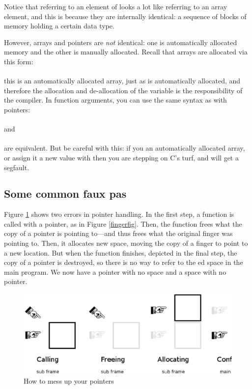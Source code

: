 \documentclass[12pt]{article}
\begin{document}
Notice that referring to an element of  looks a lot
like referring to an array element, and this is because they are
internally identical: a sequence of blocks of memory holding a certain
data type. 

However, arrays and pointers are {\em not} identical: one is
automatically allocated memory and the other is manually allocated.
Recall that arrays are allocated via this form:\\
\\
this is an automatically allocated array, just
as  is automatically allocated, and therefore
the allocation and de-allocation of the variable is the responsibility
of the compiler.  In function arguments, you can use the same
syntax as with pointers: 
\\ \\
and
\\ \\
are equivalent.
But be careful with this: if you  an automatically allocated
array, or assign it a new value with  then you are stepping
on C's turf, and will get a segfault.

\subsection{Some common faux pas} 
Figure \ref{fauxpas} shows two errors in pointer handling. In the first
step, a function is called with a pointer, as in Figure
\ref{fingerfig}. Then, the function frees what the copy of a pointer
is pointing to---and thus frees what the original finger was pointing
to. Then, it allocates new space, moving the copy of a finger to point to
a new location. But when the function finishes, depicted in the final
step, the copy of a pointer is destroyed, so there is no way to refer to
the ed space in the main program. We now have a pointer
with no space and a space with no pointer.

\begin{figure}
\hskip -1cm
\includegraphics[width=\textwidth*\real{1.1}]{pointer_faux_pas.ps}
\caption{How to mess up your pointers}
\label{fauxpas}
\end{figure}
\end{document}

